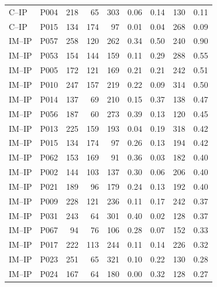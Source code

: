 \documentclass[11pt,a4paper,chapterprefix=false,parskip=false]{scrreprt}
\begin{document}
\begin{appendices}
\begin{longtable}{@{}llrrrrrrr@{}}
        C--IP  & P004 & 218 & 65  & 303 & 0.06         & 0.14         & 130                & 0.11  \\
        C--IP  & P015 & 134 & 174 & 97  & 0.01         & 0.04         & 268                & 0.09  \\
        IM--IP & P057 & 258 & 120 & 262 & 0.34         & 0.50         & 240                & 0.90  \\
        IM--IP & P053 & 154 & 144 & 159 & 0.11         & 0.29         & 288                & 0.55  \\
        IM--IP & P005 & 172 & 121 & 169 & 0.21         & 0.21         & 242                & 0.51  \\
        IM--IP & P010 & 247 & 157 & 219 & 0.22         & 0.09         & 314                & 0.50  \\
        IM--IP & P014 & 137 & 69  & 210 & 0.15         & 0.37         & 138                & 0.47  \\
        IM--IP & P056 & 187 & 60  & 273 & 0.39         & 0.13         & 120                & 0.45  \\
        IM--IP & P013 & 225 & 159 & 193 & 0.04         & 0.19         & 318                & 0.42  \\
        IM--IP & P015 & 134 & 174 & 97  & 0.26         & 0.13         & 194                & 0.42  \\
        IM--IP & P062 & 153 & 169 & 91  & 0.36         & 0.03         & 182                & 0.40  \\
        IM--IP & P002 & 144 & 103 & 137 & 0.30         & 0.06         & 206                & 0.40  \\
        IM--IP & P021 & 189 & 96  & 179 & 0.24         & 0.13         & 192                & 0.40  \\
        IM--IP & P009 & 228 & 121 & 236 & 0.11         & 0.17         & 242                & 0.37  \\
        IM--IP & P031 & 243 & 64  & 301 & 0.40         & 0.02         & 128                & 0.37  \\
        IM--IP & P067 & 94  & 76  & 106 & 0.28         & 0.07         & 152                & 0.33  \\
        IM--IP & P017 & 222 & 113 & 244 & 0.11         & 0.14         & 226                & 0.32  \\
        IM--IP & P023 & 251 & 65  & 321 & 0.10         & 0.22         & 130                & 0.28  \\
        IM--IP & P024 & 167 & 64  & 180 & 0.00         & 0.32         & 128                & 0.27  \\

\end{longtable}
\end{appendices}
\end{document}
